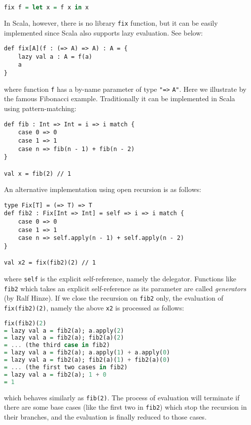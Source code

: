 \begin{lstlisting}[language=Haskell,keywords={}]
fix f = let x = f x in x
\end{lstlisting}
In Scala, however, there is no library \lstinline{fix} function, but it can be easily implemented since Scala also supports lazy evaluation. See below:
\begin{lstlisting}
def fix[A](f : (=> A) => A) : A = {
    lazy val a : A = f(a)
    a
}
\end{lstlisting}
where function \lstinline{f} has a by-name parameter of type \lstinline{"=>} \lstinline{A"}.
Here we illustrate by the famous Fibonacci example. Traditionally it can be implemented in Scala using pattern-matching:
\begin{lstlisting}
def fib : Int => Int = i => i match {
    case 0 => 0
    case 1 => 1
    case n => fib(n - 1) + fib(n - 2)
}

val x = fib(2) // 1
\end{lstlisting}
An alternative implementation using open recursion is as follows:
\begin{lstlisting}
type Fix[T] = (=> T) => T
def fib2 : Fix[Int => Int] = self => i => i match {
    case 0 => 0
    case 1 => 1
    case n => self.apply(n - 1) + self.apply(n - 2)
}

val x2 = fix(fib2)(2) // 1
\end{lstlisting}
where \lstinline{self} is the explicit self-reference, namely the delegator. Functions like \lstinline{fib2} which takes
an explicit self-reference as its parameter are called \textit{generators} (by Ralf Hinze).
If we close the recursion on \lstinline{fib2} only, the evaluation of \lstinline{fix(fib2)(2)}, namely the above \lstinline{x2} is processed as follows:
\begin{lstlisting}[language=Haskell,keywords={}]
   fix(fib2)(2)
= lazy val a = fib2(a); a.apply(2)
= lazy val a = fib2(a); fib2(a)(2)
= ... (the third case in fib2)
= lazy val a = fib2(a); a.apply(1) + a.apply(0)
= lazy val a = fib2(a); fib2(a)(1) + fib2(a)(0)
= ... (the first two cases in fib2)
= lazy val a = fib2(a); 1 + 0
= 1
\end{lstlisting}
which behaves similarly as \lstinline{fib(2)}. The process of evaluation will terminate if there are some base cases (like the first two in
\lstinline{fib2}) which stop the recursion in their branches, and the evaluation is finally reduced to those cases.

